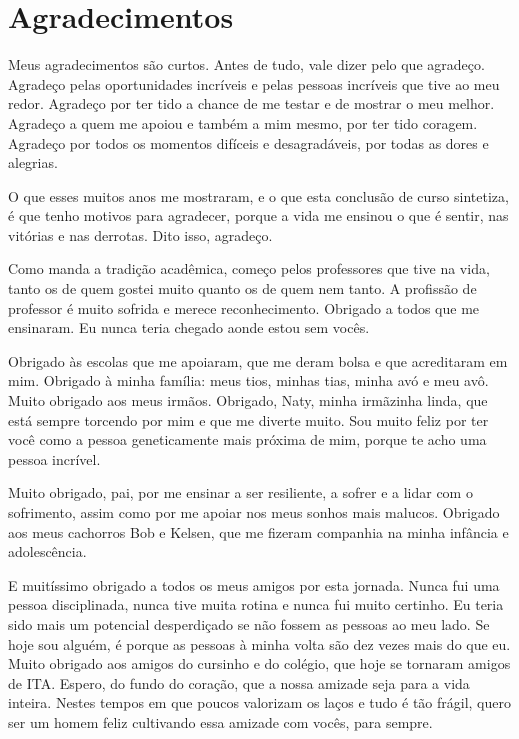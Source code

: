 \begin{otherlanguage}{brazilian}
\chapter*{Agradecimentos}

Meus agradecimentos são curtos. Antes de tudo, vale dizer pelo que agradeço. Agradeço pelas oportunidades incríveis e pelas pessoas incríveis que tive ao meu redor. Agradeço por ter tido a chance de me testar e de mostrar o meu melhor. Agradeço a quem me apoiou e também a mim mesmo, por ter tido coragem. Agradeço por todos os momentos difíceis e desagradáveis, por todas as dores e alegrias.

O que esses muitos anos me mostraram, e o que esta conclusão de curso sintetiza, é que tenho motivos para agradecer, porque a vida me ensinou o que é sentir, nas vitórias e nas derrotas. Dito isso, agradeço.

Como manda a tradição acadêmica, começo pelos professores que tive na vida, tanto os de quem gostei muito quanto os de quem nem tanto. A profissão de professor é muito sofrida e merece reconhecimento. Obrigado a todos que me ensinaram. Eu nunca teria chegado aonde estou sem vocês.

Obrigado às escolas que me apoiaram, que me deram bolsa e que acreditaram em mim. Obrigado à minha família: meus tios, minhas tias, minha avó e meu avô. Muito obrigado aos meus irmãos. Obrigado, Naty, minha irmãzinha linda, que está sempre torcendo por mim e que me diverte muito. Sou muito feliz por ter você como a pessoa geneticamente mais próxima de mim, porque te acho uma pessoa incrível.

Muito obrigado, pai, por me ensinar a ser resiliente, a sofrer e a lidar com o sofrimento, assim como por me apoiar nos meus sonhos mais malucos. Obrigado aos meus cachorros Bob e Kelsen, que me fizeram companhia na minha infância e adolescência.

E muitíssimo obrigado a todos os meus amigos por esta jornada. Nunca fui uma pessoa disciplinada, nunca tive muita rotina e nunca fui muito certinho. Eu teria sido mais um potencial desperdiçado se não fossem as pessoas ao meu lado. Se hoje sou alguém, é porque as pessoas à minha volta são dez vezes mais do que eu. Muito obrigado aos amigos do cursinho e do colégio, que hoje se tornaram amigos de ITA. Espero, do fundo do coração, que a nossa amizade seja para a vida inteira. Nestes tempos em que poucos valorizam os laços e tudo é tão frágil, quero ser um homem feliz cultivando essa amizade com vocês, para sempre.


\end{otherlanguage}
